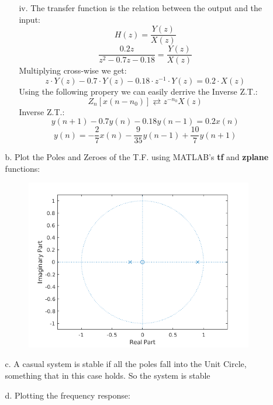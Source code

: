 \documentclass[12pt, a4paper]{article}
\begin{document}
\begin{enumerate}
\begin{enumerate}
\begin{enumerate}
            \item[iv.] The transfer function is the relation between the output and the input:
            \[H(z) = \frac{Y(z)}{X(z)}\]
            \[\frac{0.2z}{z^2 - 0.7z - 0.18} = \frac{Y(z)}{X(z)}\]
            Multiplying cross-wise we get:
            \[z\cdot Y(z) - 0.7\cdot Y(z) - 0.18 \cdot z^{-1} \cdot Y(z) = 0.2 \cdot X(z)\]
            Using the following propery we can easily derrive the Inverse Z.T.:
            \[Z_n[x(n - n_0)] \rightleftarrows z^{-n_0} X(z)\]
            Inverse Z.T.:
            \[y(n+1) - 0.7y(n) - 0.18y(n-1) = 0.2x(n)\]
            \[\boxed{y(n) = -\frac{2}{7}x(n) -\frac{9}{35}y(n-1) + \frac{10}{7}y(n+1)}\]
        \end{enumerate}
        \item[b.] Plot the Poles and Zeroes of the T.F. using MATLAB's \textbf{tf} and \textbf{zplane} functions:
        \begin{figure}[H]
            \centering
            \includegraphics{zplane.png}
        \end{figure}
        \item[c.] A casual system is stable if all the poles fall into the Unit Circle, something that in this case holds. So the system is stable
        \item[d.] Plotting the frequency response:
        \begin{figure}[H]
            \centering

\end{figure}
\end{enumerate}
\end{enumerate}
\end{document}
